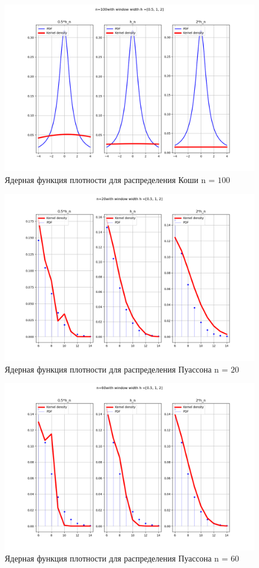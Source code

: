 \documentclass[a4]{article}
\begin{document}
\begin{center}
\begin{figure}[H]
	\caption{Ядерная функция плотности для распределения Коши n = $100$ }
	\includegraphics[width=\textwidth]{cauchy_pdf_100.png} 
\end{figure}

\begin{figure}[H]
\caption{Ядерная функция плотности для распределения Пуассона n = $20$}
\includegraphics[width=\textwidth]{poisson_pdf_20.png} 
\end{figure}

\begin{figure}[H]
	\caption{Ядерная функция плотности для распределения Пуассона n = $60$}
	\includegraphics[width=\textwidth]{poisson_pdf_60.png} 
\end{figure}


\end{center}
\end{document}

